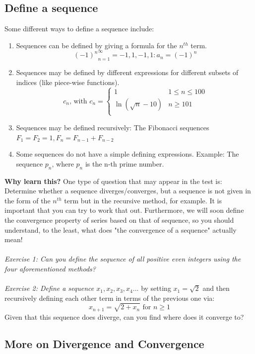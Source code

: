 \documentclass{article}
\begin{document}
\subsection{Define a sequence}
Some different ways to define a sequence include: 
\begin{enumerate}
    \item Sequences can be defined by giving a formula for the $n^{th}$ term.
    $${(-1)^n}^{\infty}_{n=1} = {-1, 1, -1, 1}: a_n = (-1)^n$$
    \item Sequences may be defined by different expressions for different subsets of indices (like piece-wise functions). 
    $${c_n} \text{, with } c_n = \left\{\begin{matrix}
1 & 1 \leq n \leq 100  \\
\ln (\sqrt{n} - 10) & n \geq 101 \\
\end{matrix}$$
    \item Sequences may be defined recursively: The Fibonacci sequences $F_1 = F_2 = 1 , F_n = F_{n-1} + F_{n-2} $
    \item Some sequences do not have a simple defining expressions. Example: The sequence ${p_n}$, where ${p_n}$ is the n-th prime number. 
\end{enumerate}
\textbf{Why learn this?} One type of question that may appear in the test is: Determine whether a sequence diverges/converges, but a sequence is not given in the form of the $n^{th}$ term but in the recursive method, for example. It is important that you can try to work that out. Furthermore, we will soon define the convergence property of series based on that of sequence, so you should understand, to the least, what does "the convergence of a sequence" actually mean!\\ \\
\textit{Exercise 1: Can you define the sequence of all positive even integers using the four aforementioned methods?} \\ \\
\textit{Exercise 2: Define a sequence $x_1, x_2, x_3, x_4...$} by setting $x_1 = \sqrt{2}$ and then recursively defining each other term in terms of the previous one via: 
$$ x_{n+1} = \sqrt{2 + x_n} \text{ for } n \geq 1$$
Given that this sequence does diverge,  can you find where does it converge to?
\subsection{More on Divergence and Convergence}
\end{document}
